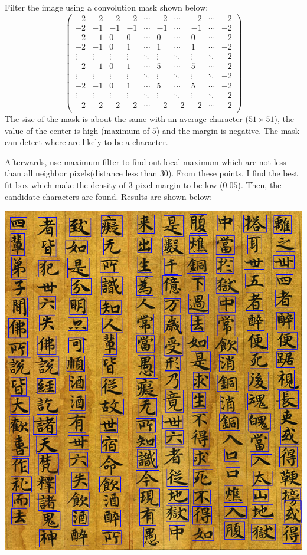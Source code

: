 \documentclass[a4paper,11pt]{article}
\begin{document}
Filter the image using a convolution mask shown below:
\[
 \begin{pmatrix}
  -2 & -2 & -2 & -2 & \cdots & -2 & \cdots & -2 & \cdots & -2 \\
  -2 & -1 & -1 & -1 & \cdots & -1 & \cdots & -1 & \cdots & -2 \\
  -2 & -1 & 0 & 0 & \cdots & 0 & \cdots & 0 & \cdots & -2 \\
  -2 & -1 & 0 & 1 & \cdots & 1 & \cdots & 1 & \cdots & -2 \\
  \vdots & \vdots & \vdots & \vdots & \ddots & \vdots & \ddots & \vdots & \ddots & -2 \\
  -2 & -1 & 0 & 1 & \cdots & 5 & \cdots & 5 & \cdots & -2 \\
  \vdots & \vdots & \vdots & \vdots & \ddots & \vdots & \ddots & \vdots & \ddots & -2 \\
  -2 & -1 & 0 & 1 & \cdots & 5 & \cdots & 5 & \cdots & -2 \\
  \vdots & \vdots & \vdots & \vdots & \ddots & \vdots & \ddots & \vdots & \ddots & -2 \\
  -2 & -2 & -2 & -2 & \cdots & -2 & -2 & -2 & \cdots & -2 \\
 \end{pmatrix}
\]
The size of the mask is about the same with an average character ($51 \times 51$), the value of the center is high (maximum of $5$) and the margin is negative. The mask can detect where are likely to be a character.

Afterwards, use maximum filter to find out local maximum which are not less than all neighbor pixels(distance less than $30$). From these points, I find the best fit box which make the density of 3-pixel margin to be low ($0.05$). Then, the candidate characters are found. Results are shown below:
\begin{center}
\includegraphics[width=.8\textwidth]{cand}
\end{center}
\end{document}
